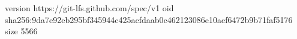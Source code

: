 version https://git-lfs.github.com/spec/v1
oid sha256:9da7e92eb295bf345944c425acfdaab0c462123086e10aef6472b9b71faf5176
size 5566
